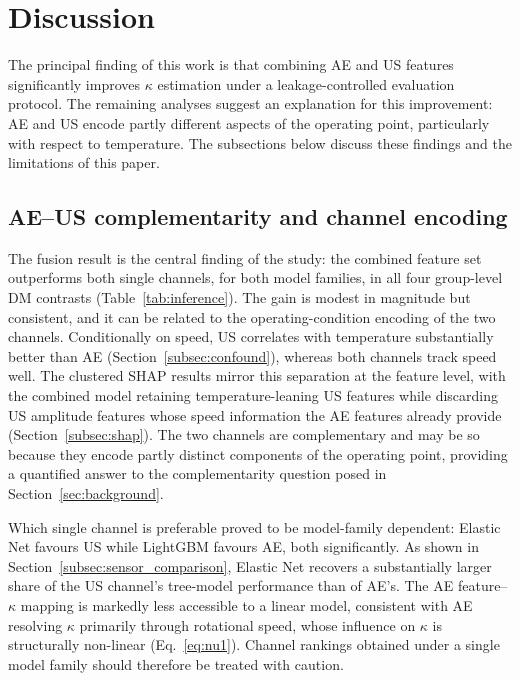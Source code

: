 \section{Discussion}
\label{sec:discussion}
The principal finding of this work is that combining AE and US features significantly improves $\kappa$ estimation under a leakage-controlled evaluation protocol. The remaining analyses suggest an explanation for this improvement: AE and US encode partly different aspects of the operating point, particularly with respect to temperature. The subsections below discuss these findings and the limitations of this paper.

\subsection{AE--US complementarity and channel encoding}
\label{subsec:disc_channels}

The fusion result is the central finding of the study: the combined feature
set outperforms both single channels, for both model families, in all four
group-level DM contrasts (Table~\ref{tab:inference}). The gain is modest in
magnitude but consistent, and it can be related to the
operating-condition encoding of the two channels. Conditionally on speed, US
correlates with temperature substantially better than AE
(Section~\ref{subsec:confound}), whereas both channels track speed well. The clustered SHAP results mirror this separation at the feature level, with the combined model retaining temperature-leaning US features while discarding US amplitude features whose speed information the AE features already provide (Section~\ref{subsec:shap}). The two channels are
complementary and may be so because they encode partly distinct components of the
operating point, providing a quantified answer to the complementarity question
posed in Section~\ref{sec:background}.

Which single channel is preferable proved to be model-family dependent:
Elastic Net favours US while LightGBM favours AE, both significantly. As shown
in Section~\ref{subsec:sensor_comparison}, Elastic Net recovers a substantially
larger share of the US channel's tree-model performance than of AE's. The AE
feature--$\kappa$ mapping is markedly less accessible to a linear model,
consistent with AE resolving $\kappa$ primarily through rotational speed,
whose influence on $\kappa$ is structurally non-linear
(Eq.~\eqref{eq:nu1}). Channel rankings obtained under a single model family
should therefore be treated with caution.


